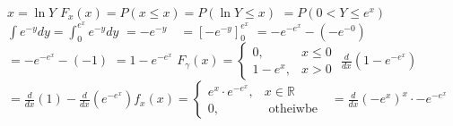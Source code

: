 $x=\ln Y$
$F_{x}(x)=P(x \leqslant x)=P(\ln Y \leqslant x)$
$=P\left(0<Y \leqslant e^{x}\right)$
$\int e^{-y} d y=\int_{0}^{e^{x}} e^{-y} d y$
$=-e^{-y} \quad=\left[-e^{-y}\right]_{0}^{e^{x}}$
$=-e^{-e^{x}}-\left(-e^{-0}\right)$
$=-e^{-e^{x}}-(-1)$
$=1-e^{-e^{x}}$
$F_{\gamma}(x)=\left\{\begin{array}{cc}0, & x \leq 0 \\ 1-e^{x}, & x>0\end{array}\right.$
$\frac{d}{d x}\left(1-e^{-e^{x}}\right)$
$=\frac{d}{d x}(1)-\frac{d}{d x}\left(e^{-e^{x}}\right) f_{x}(x)=\left\{\begin{array}{cc}e^{x} \cdot e^{-e^{x}}, & x \in \mathbb{R} \\ 0, & \text { otheiwbe }\end{array}\right.$
$=\frac{d}{d x}\left(-e^{x}\right)^{x} \cdot-e^{-e^{x}}$
